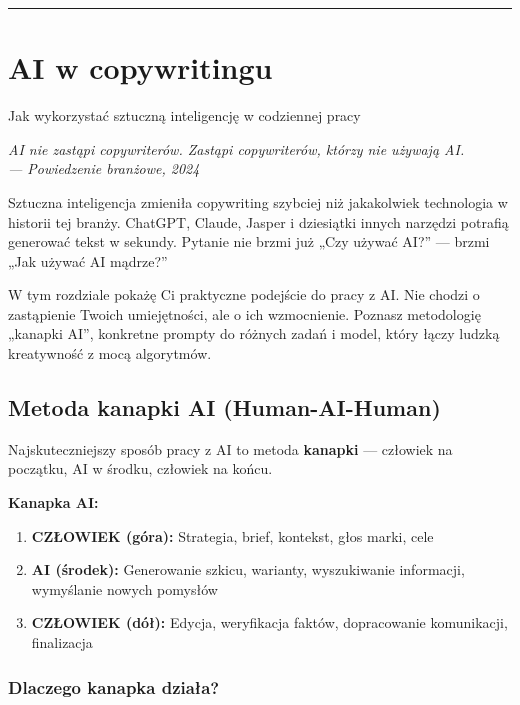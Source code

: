 \documentclass[
  12pt,
  a4paper,
  twoside,
  openright,
  12pt,
  DIV=12,
  BCOR=12mm]{scrbook}
\newcommand{\chapteropener}[1]{%
  \begin{center}
    \large\itshape\color{textmuted}#1
  \end{center}
  \vspace{1em}
}
\newcommand{\decoline}{%
  \begin{center}
    \textcolor{bordergray}{\rule{0.3\textwidth}{0.5pt}}
  \end{center}
}
\begin{document}
\decoline


\chapter{AI w copywritingu}\label{ai-w-copywritingu}

Jak wykorzystać sztuczną inteligencję w codziennej pracy

\hfill\break

\chapteropener{AI nie zastąpi copywriterów. Zastąpi copywriterów, którzy nie używają AI.\\--- Powiedzenie branżowe, 2024}

Sztuczna inteligencja zmieniła copywriting szybciej niż jakakolwiek
technologia w historii tej branży. ChatGPT, Claude, Jasper i dziesiątki
innych narzędzi potrafią generować tekst w sekundy. Pytanie nie brzmi
już „Czy używać AI?'' --- brzmi „Jak używać AI mądrze?''

W tym rozdziale pokażę Ci praktyczne podejście do pracy z AI. Nie chodzi
o zastąpienie Twoich umiejętności, ale o ich wzmocnienie. Poznasz
metodologię „kanapki AI'', konkretne prompty do różnych zadań i model,
który łączy ludzką kreatywność z mocą algorytmów.

\section{Metoda kanapki AI
(Human-AI-Human)}\label{metoda-kanapki-ai-human-ai-human}

Najskuteczniejszy sposób pracy z AI to metoda \textbf{kanapki} ---
człowiek na początku, AI w środku, człowiek na końcu.

\begin{wazne}
\textbf{Kanapka AI:}
\begin{enumerate}
  \item \textbf{CZŁOWIEK (góra):} Strategia, brief, kontekst, głos marki, cele
  \item \textbf{AI (środek):} Generowanie szkicu, warianty, wyszukiwanie informacji, wymyślanie nowych pomysłów
  \item \textbf{CZŁOWIEK (dół):} Edycja, weryfikacja faktów, dopracowanie komunikacji, finalizacja
\end{enumerate}
\end{wazne}

\subsection{Dlaczego kanapka działa?}\label{dlaczego-kanapka-dziaux142a}
\end{document}
